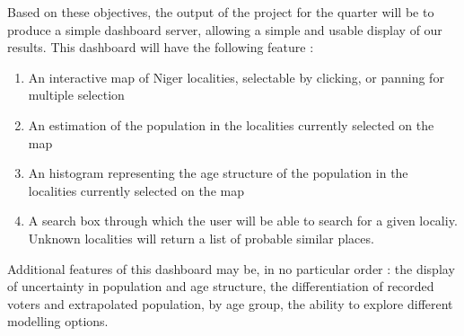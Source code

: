 \documentclass[12pt]{article}\usepackage[]{graphicx}\usepackage[]{color}
\begin{document}
Based on these objectives, the output of the project for the quarter will  be to produce a simple dashboard server, allowing a simple and usable display of our results. This dashboard will have the following feature :
\begin{enumerate}
	\item An interactive map of Niger localities, selectable by clicking, or panning for multiple selection
	\item An estimation of the population in the localities currently selected on the map
	\item An histogram representing the age structure of the population in the localities currently selected on the map
	\item A search box through which the user will be able to search for a given localiy. Unknown localities will return a list of probable similar places.
\end{enumerate}

Additional features of this dashboard may be, in no particular order : the display of uncertainty in population and age structure, the differentiation of recorded voters and extrapolated population, by age group, the ability to explore different modelling options.

\newpage

\end{document}
